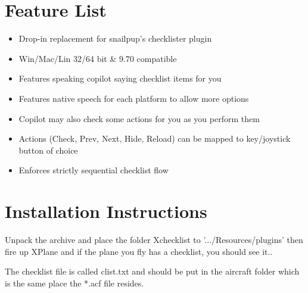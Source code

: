 \documentclass[11pt,parskip=half,a4paper]{scrartcl}
\begin{document}
\section{Feature List}
 
\begin{itemize}
\item Drop-in replacement for snailpup's checklister plugin
\end{itemize}

\begin{itemize}
\item Win/Mac/Lin 32/64 bit \& 9.70 compatible
\end{itemize}

\begin{itemize}
\item Features speaking {\textquotedbl}copilot{\textquotedbl} saying checklist items for you
\end{itemize}

\begin{itemize}
\item Features native speech for each platform to allow more options \ \ \ 
\end{itemize}

\begin{itemize}
\item Copilot may also check some actions for you as you perform them
\end{itemize}

\begin{itemize}
\item Actions (Check, Prev, Next, Hide, Reload) can be mapped to key/joystick button of choice
\end{itemize}

\begin{itemize}
\item Enforces strictly sequential checklist flow
\end{itemize}

\newpage
\section{Installation Instructions}

Unpack the archive and place the folder Xchecklist to '.../Resources/plugins' then fire up XPlane and if the plane you fly has a checklist, you should see it.. \newline

The checklist file is called clist.txt and should be put in the aircraft folder which is the same place the *.acf file resides. \newline
\end{document}
